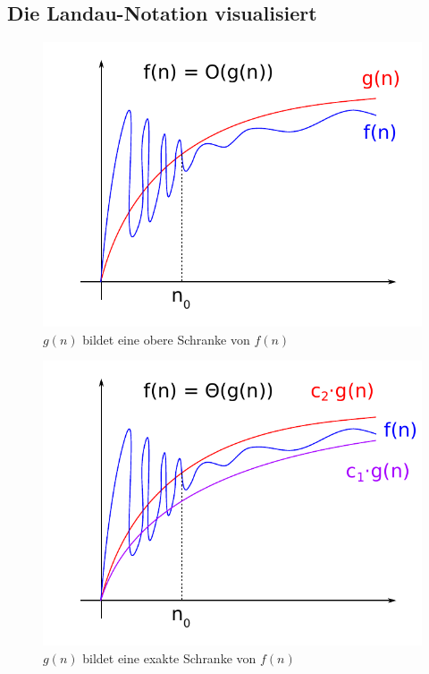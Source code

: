 \subsection{Die Landau-Notation visualisiert}
%
\begin{figure}[p]
 \begin{center}
  \includegraphics{img/upper_bound.pdf}
  \caption{$g(n)$ bildet eine obere Schranke von $f(n)$}
  \label{fig:upper}
 \end{center}
\end{figure}
\begin{figure}[p]
 \begin{center}
  \includegraphics{img/exact_bound.pdf}
  \caption{$g(n)$ bildet eine exakte Schranke von $f(n)$}
  \label{fig:exact}
 \end{center}
\end{figure}

